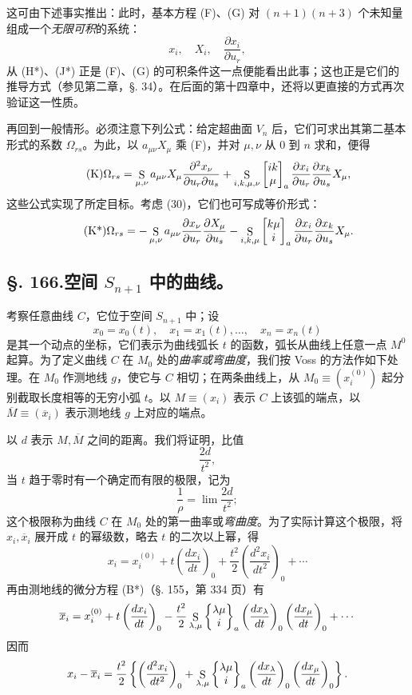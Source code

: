 这可由下述事实推出：此时，基本方程 (F)、(G) 对 \((n+1)(n+3)\) 个未知量组成一个\emph{无限可积}的系统：
\[
 x_i,
 \quad X_i,
 \quad \frac{\partial x_i}{\partial u_r},
\]
从 (H*)、(J*) 正是 (F)、(G) 的可积条件这一点便能看出此事；这也正是它们的推导方式（参见第二章，\S. 34）。在后面的第十四章中，还将以更直接的方式再次验证这一性质。

再回到一般情形。必须注意下列公式：给定超曲面 \(V_n\) 后，它们可求出其第二基本形式的系数 \(\Omega_{rs}\)。为此，以 \(a_{\mu\nu}X_\mu\) 乘 (F)，并对 \(\mu,\nu\) 从 \(0\) 到 \(n\) 求和，便得
\begin{equation}\tag{K}
 \Omega_{rs}=\mathop{\mathrm{S}}_{\mu,\nu}a_{\mu\nu}X_\mu
 \frac{\partial^2x_\nu}{\partial u_r\partial u_s}
 +\mathop{\mathrm{S}}_{i,k,\mu,\nu}\left[\begin{matrix}ik\\\mu\end{matrix}\right]_{a}
 \frac{\partial x_i}{\partial u_r}\frac{\partial x_k}{\partial u_s}X_\mu,
\end{equation}
这些公式实现了所定目标。考虑 (30)，它们也可写成等价形式：
\begin{equation}\tag{K*}
 \Omega_{rs}=-\mathop{\mathrm{S}}_{\mu,\nu}a_{\mu\nu}
 \frac{\partial x_\nu}{\partial u_r}\frac{\partial X_\mu}{\partial u_s}
 -\mathop{\mathrm{S}}_{i,k,\mu}\left[\begin{matrix}k\mu\\i\end{matrix}\right]_{a}
 \frac{\partial x_i}{\partial u_r}\frac{\partial x_k}{\partial u_s}X_\mu.
\end{equation}

\subsection*{\S. 166.\quad 空间 \(S_{n+1}\) 中的曲线。}

考察任意曲线 \(C\)，它位于空间 \(S_{n+1}\) 中；设
\[
 x_0=x_0(t),
\quad x_1=x_1(t),
\ldots,
\quad x_n=x_n(t)
\]
是其一个动点的坐标，它们表示为曲线弧长 \(t\) 的函数，弧长从曲线上任意一点 \(M^0\) 起算。为了定义曲线 \(C\) 在 \(M_0\) 处的\emph{曲率或弯曲度}，我们按 Voss 的方法作如下处理。在 \(M_0\) 作测地线 \(g\)，使它与 \(C\) 相切；在两条曲线上，从 \(M_0\equiv(x_i^{(0)})\) 起分别截取长度相等的无穷小弧 \(t\)。以 \(M\equiv(x_i)\) 表示 \(C\) 上该弧的端点，以 \(\overline M\equiv(\overline x_i)\) 表示测地线 \(g\) 上对应的端点。

以 \(d\) 表示 \(M,\overline M\) 之间的距离。我们将证明，比值
\[
 \frac{2d}{t^2},
\]
当 \(t\) 趋于零时有一个确定而有限的极限，记为
\[
 \frac1\rho=\lim\frac{2d}{t^2};
\]
这个极限称为曲线 \(C\) 在 \(M_0\) 处的第一曲率或\emph{弯曲度}。为了实际计算这个极限，将 \(x_i,\overline x_i\) 展开成 \(t\) 的幂级数，略去 \(t\) 的二次以上幂，得
\[
 x_i=x_i^{(0)}+t\left(\frac{dx_i}{dt}\right)_0+\frac{t^2}{2}\left(\frac{d^2x_i}{dt^2}\right)_0+\cdots
\]
再由测地线的微分方程 (B*)（\S. 155，第 334 页）有
\[
 \overline x_i=x_i^{(0)}+t\left(\frac{dx_i}{dt}\right)_0-
 \frac{t^2}{2}\mathop{\mathrm{S}}_{\lambda,\mu}\left\{\begin{matrix}\lambda\mu\\i\end{matrix}\right\}_{a}
 \left(\frac{dx_\lambda}{dt}\right)_0\left(\frac{dx_\mu}{dt}\right)_0+
\cdots
\]
因而
\[
 x_i-\overline x_i=\frac{t^2}{2}\left\{\left(\frac{d^2x_i}{dt^2}\right)_0+
 \mathop{\mathrm{S}}_{\lambda,\mu}\left\{\begin{matrix}\lambda\mu\\i\end{matrix}\right\}_{a}
 \left(\frac{dx_\lambda}{dt}\right)_0\left(\frac{dx_\mu}{dt}\right)_0\right\}.
\]

